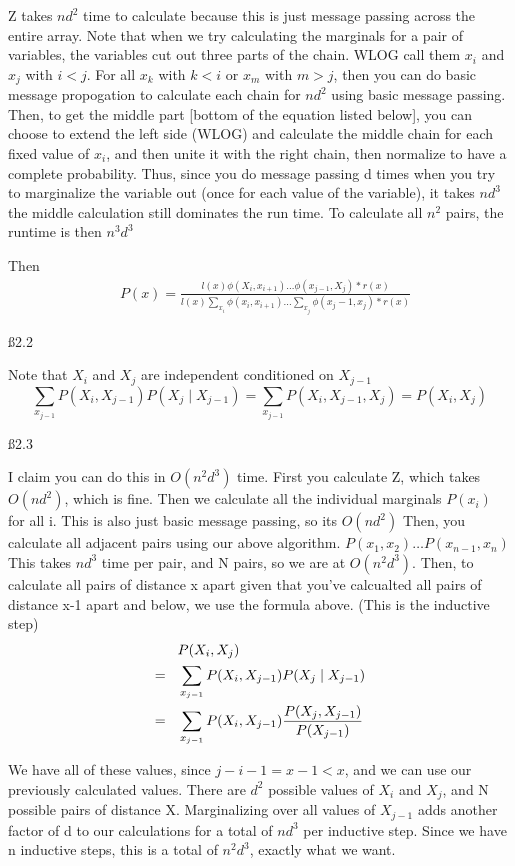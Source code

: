 Z takes $nd^2$ time to calculate because this is just message passing across the entire array. Note that when we try calculating the marginals for a pair of variables, the variables cut out three parts of the chain. WLOG call them $x_i$ and $x_j$ with $i<j$. For all $x_k$ with $k<i$ or $x_m$ with $m>j$, then you can do basic message propogation to calculate each chain for $nd^2$ using basic message passing. Then, to get the middle part [bottom of the equation listed below], you can choose to extend the left side (WLOG) and calculate the middle chain for each fixed value of $x_i$, and then unite it with the right chain, then normalize to have a complete probability. Thus, since you do message passing d times when you try to marginalize the variable out (once for each value of the variable), it takes $nd^3$ the middle calculation still dominates the run time. To calculate all $n^2$ pairs, the runtime is then $n^3d^3$


Then \begin{align*}
& P(x) = \frac{l(x) \phi(X_i,x_{i+1}) \dots\phi(x_{j-1},X_j)*r(x)}{l(x) \sum_{x_i}\phi(x_i,x_{i+1}) \dots \sum_{x_j}\phi(x_j-1,x_{j})*r(x)}
\end{align*}

\ss{2.2}

Note that $X_i$ and $X_j$ are independent conditioned on $X_{j-1}$
\[\sum_{x_{j-1}} P(X_i,X_{j-1})P(X_j \mid X_{j-1}) = \sum_{x_{j-1}} P(X_i,X_{j-1},X_j) = P(X_i,X_j) 
\]

\ss{2.3}

I claim you can do this in $O(n^2d^3)$ time. First you calculate Z, which takes $O(nd^2)$, which is fine. Then we calculate all the individual marginals $P(x_i)$ for all i. This is also just basic message passing, so its $O(nd^2)$  Then, you calculate all adjacent pairs using our above algorithm. $P(x_1,x_2) \dots P(x_{n-1},x_n)$ This takes $nd^3$ time per pair, and N pairs, so we are at $O(n^2d^3)$.
Then, to calculate all pairs of distance x apart given that you've calcualted all pairs of distance x-1 apart and below, we use the formula above. (This is the inductive step)
\begin{align*}
& P(X_i,X_j) \\ = \hspace{3 mm} & \sum_{x_{j-1}} P(X_i,X_{j-1})P(X_j \mid X_{j-1}) \\ = \hspace{3 mm} &
\sum_{x_{j-1}} P(X_i,X_{j-1}) \frac{P(X_j, X_{j-1})}{P(X_{j-1})}
\end{align*}

We have all of these values, since $j-i-1 = x-1 <x$, and we can use our previously calculated values. There are $d^2$ possible values of $X_i$ and $X_j$, and N possible pairs of distance X. Marginalizing over all values of $X_{j-1}$ adds another factor of d to our calculations for a total of $nd^3$ per inductive step. Since we have n inductive steps, this is a total of $n^2d^3$, exactly what we want.

